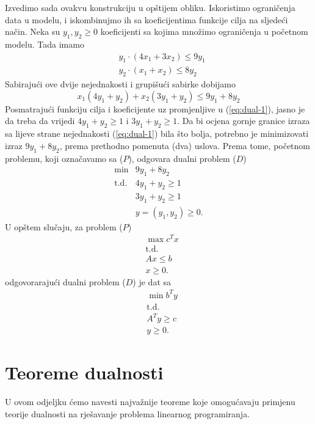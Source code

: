 \documentclass[b5paper, utf8, 11pt, colorlinks]{book}
\theoremstyle{definition}
\begin{document}
Izvedimo sada ovakvu konstrukciju u opštijem obliku. Iskoristimo ograničenja data u modelu, i iskombinujmo ih sa koeficijentima funkcije cilja na sljedeći način. Neka su $y_1, y_2 \geq 0$ koeficijenti sa kojima množimo ograničenja u početnom modelu. Tada imamo 
\begin{align*}
	&y_1 \cdot (4x_1 + 3x_2) \leq 9 y_1 \\
	&y_2 \cdot (x_1 + x_2 ) \leq 8 y_2 
\end{align*}
Sabirajući ove dvije nejednakosti i grupišući sabirke dobijamo 
\begin{equation}\label{eq:dual-1}
	x_1 ( 4 y_1 + y_2 ) + x_2 ( 3 y_1 + y_2 ) \leq 9 y_1 + 8 y_2 
\end{equation}
Posmatrajući funkciju cilja i koeficijente uz promjenljive u (\ref{eq:dual-1}), jasno je da treba da vrijedi 
$4 y_1 + y_2 \geq 1$ i $3 y_1 + y_2 \geq 1$. Da bi ocjena gornje granice   izraza sa lijeve strane nejednakosti (\ref{eq:dual-1}) bila što bolja,   potrebno je minimizovati izraz $9y_1 + 8 y_2$, prema prethodno pomenuta (dva) uslova. Prema tome, početnom problemu, koji označavamo sa ($P$), odgovara dualni problem ($D$)
 $$\begin{array}{ll}
	\min                    &  9 y_1+ 8 y_2        \\
	\mbox{t.d.}   &  4 y_1     +   y_2 \geq 1   \\
	&  3 y_1 + y_2 \geq 1 \\
	&            y=(y_1,y_2) \geq 0.
 \end{array}$$
U opštem slučaju,  za problem ($P$) %
\begin{align*}
	& \max c^T x  \\
	& \mbox{t.d.} \nonumber \\
	& A x \leq b \\
	& x \geq 0.
\end{align*}
odgovorarajući dualni problem ($D$)  je dat sa 
\begin{align*}
	& \min b^T y  \\
	& \mbox{t.d.} \nonumber \\
	& A^T y \geq c \\
	& y \geq 0.
\end{align*}

\section{Teoreme dualnosti}
U ovom odjeljku ćemo navesti najvažnije teoreme koje omogućavaju primjenu teorije dualnosti na rješavanje problema linearnog programiranja.
\end{document}
